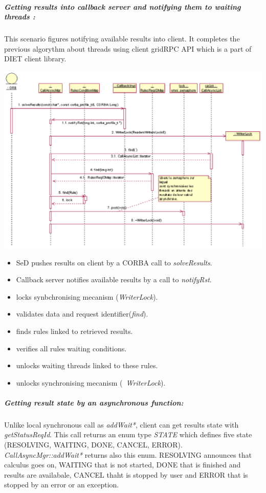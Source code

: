   \subparagraph{Getting results into callback server and notifying them to waiting threads :}
  This scenario figures notifying available results into client. It completes
  the previous algorythm about threads using client gridRPC API which is a 
  part of DIET client library.

  \begin{center}
  \includegraphics{./fig/CallbackSynchronisationSequenceDiagram.ps}
  \end{center}

  \begin{itemize}
  \item SeD pushes results on client by a CORBA call to \emph{solveResults}.
  \item Callback server notifies available results by a call to \emph{notifyRst}.
  \item locks synbchronising mecanism (\emph{WriterLock}).
  \item validates data and request identifier(\emph{find}).
  \item finds rules linked to retrieved results.
  \item verifies all rules waiting conditions.
  \item unlocks waiting threads linked to these rules.
  \item unlocks synchronising mecanism (\emph{~WriterLock}).
  \end{itemize}

  \subparagraph{Getting result state by an asynchronous function:}
  Unlike local synchronous call as \emph{addWait*}, client can get results
  state with \emph{getStatusReqId}. This call returns an enum type \emph{STATE}
  which defines five state (RESOLVING, WAITING, DONE, CANCEL, ERROR). 
  \emph{CallAsyncMgr::addWait*} returns also this enum.
  RESOLVING announces that calculus goes on, WAITING that is not started, 
  DONE that is finished and results are availabale, CANCEL thaht is stopped
  by user and ERROR that is stopped by an error or an exception. 

